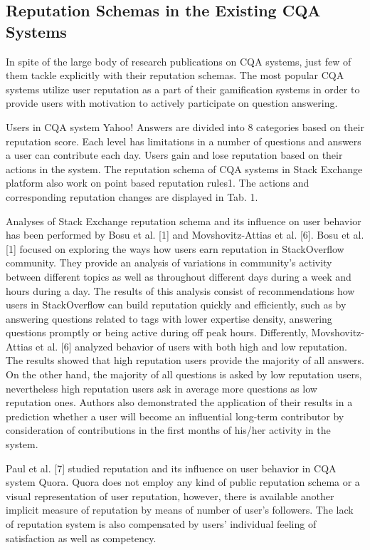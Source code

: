 \documentclass{llncs}
\begin{document}
		\subsection{Reputation Schemas in the Existing CQA Systems}
			In spite of the large body of research publications on CQA systems, just few of
			them tackle explicitly with their reputation schemas. The most popular CQA
			systems utilize user reputation as a part of their gamification systems in order
			to provide users with motivation to actively participate on question answering.
			
			Users in CQA system Yahoo! Answers are divided into 8 categories based on
			their reputation score. Each level has limitations in a number of questions and
			answers a user can contribute each day. Users gain and lose reputation based
			on their actions in the system. The reputation schema of CQA systems in Stack
			Exchange platform also work on point based reputation rules1. The actions and
			corresponding reputation changes are displayed in Tab. 1.

			Analyses of Stack Exchange reputation schema and its influence on user
			behavior has been performed by Bosu et al. [1] and Movshovitz-Attias et al.
			[6]. Bosu et al. [1] focused on exploring the ways how users earn reputation
			in StackOverflow community. They provide an analysis of variations in community’s
			activity between different topics as well as throughout different days
			during a week and hours during a day. The results of this analysis consist of
			recommendations how users in StackOverflow can build reputation quickly and
			efficiently, such as by answering questions related to tags with lower expertise
			density, answering questions promptly or being active during off peak hours.
			Differently, Movshovitz-Attias et al. [6] analyzed behavior of users with both
			high and low reputation. The results showed that high reputation users provide
			the majority of all answers. On the other hand, the majority of all questions is
			asked by low reputation users, nevertheless high reputation users ask in average
			more questions as low reputation ones. Authors also demonstrated the application
			of their results in a prediction whether a user will become an influential
			long-term contributor by consideration of contributions in the first months of
			his/her activity in the system.

			Paul et al. [7] studied reputation and its influence on user behavior in CQA
			system Quora. Quora does not employ any kind of public reputation schema
			or a visual representation of user reputation, however, there is available another
			implicit measure of reputation by means of number of user’s followers. The lack of
			reputation system is also compensated by users’ individual feeling of satisfaction
			as well as competency.
			
\end{document}
